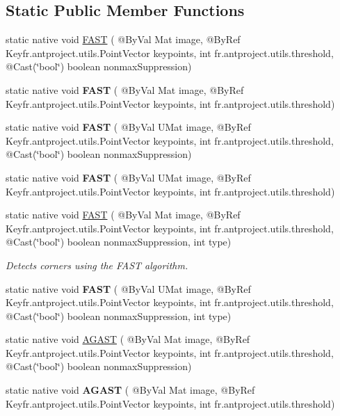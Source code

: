 \subsection*{Static Public Member Functions}
\begin{DoxyCompactItemize}
\item 
static native void \hyperlink{group__features2d__main_gabceff7e5d16ac9f888fa12e3e8a3f39e}{F\+A\+ST} ( @By\+Val Mat image, @By\+Ref Key\+fr.antproject.utils.Point\+Vector keypoints, int fr.antproject.utils.threshold, @Cast(\char`\"{}bool\char`\"{}) boolean nonmax\+Suppression)
\item 
static native void {\bfseries F\+A\+ST} ( @By\+Val Mat image, @By\+Ref Key\+fr.antproject.utils.Point\+Vector keypoints, int fr.antproject.utils.threshold)
\item 
static native void {\bfseries F\+A\+ST} ( @By\+Val U\+Mat image, @By\+Ref Key\+fr.antproject.utils.Point\+Vector keypoints, int fr.antproject.utils.threshold, @Cast(\char`\"{}bool\char`\"{}) boolean nonmax\+Suppression)
\item 
static native void {\bfseries F\+A\+ST} ( @By\+Val U\+Mat image, @By\+Ref Key\+fr.antproject.utils.Point\+Vector keypoints, int fr.antproject.utils.threshold)
\item 
static native void \hyperlink{group__features2d__main_ga7b940fc6d27c261d531040a7f8dd22af}{F\+A\+ST} ( @By\+Val Mat image, @By\+Ref Key\+fr.antproject.utils.Point\+Vector keypoints, int fr.antproject.utils.threshold, @Cast(\char`\"{}bool\char`\"{}) boolean nonmax\+Suppression, int type)
\begin{DoxyCompactList}\small\item\em Detects corners using the F\+A\+ST algorithm. \end{DoxyCompactList}\item 
static native void {\bfseries F\+A\+ST} ( @By\+Val U\+Mat image, @By\+Ref Key\+fr.antproject.utils.Point\+Vector keypoints, int fr.antproject.utils.threshold, @Cast(\char`\"{}bool\char`\"{}) boolean nonmax\+Suppression, int type)
\item 
static native void \hyperlink{group__features2d__main_ga849ee8acfb310ef13c3fd8a8f25327ed}{A\+G\+A\+ST} ( @By\+Val Mat image, @By\+Ref Key\+fr.antproject.utils.Point\+Vector keypoints, int fr.antproject.utils.threshold, @Cast(\char`\"{}bool\char`\"{}) boolean nonmax\+Suppression)
\item 
static native void {\bfseries A\+G\+A\+ST} ( @By\+Val Mat image, @By\+Ref Key\+fr.antproject.utils.Point\+Vector keypoints, int fr.antproject.utils.threshold)

\end{DoxyCompactItemize}

